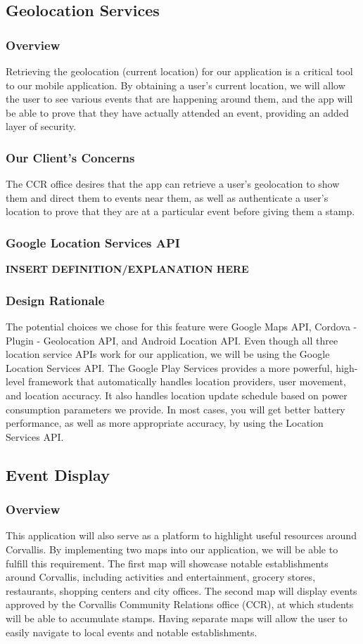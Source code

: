 \documentclass[draftclsnofoot, onecolumn, 10pt, compsoc]{IEEEtran}
\begin{document}
		\subsection{Geolocation Services}
			\subsubsection{Overview}
				Retrieving the geolocation (current location) for our application is a critical tool to our mobile application. By obtaining a user's current location, we will allow the user to see various events that are happening around them, and the app will be able to prove that they have actually attended an event, providing an added layer of security. 
			\subsubsection{Our Client's Concerns}
				The CCR office desires that the app can retrieve a user's geolocation to show them and direct them to events near them, as well as authenticate a user's location to prove that they are at a particular event before giving them a stamp.
			\subsubsection{Google Location Services API}
				\textbf{INSERT DEFINITION/EXPLANATION HERE}
				~\cite{GMaps}
			\subsubsection{Design Rationale}
				The potential choices we chose for this feature were Google Maps API, Cordova - Plugin - Geolocation API, and Android Location API. Even though all three location service APIs work for our application, we will be using the Google Location Services API. The Google Play Services provides a more powerful, high-level framework that automatically handles location providers, user movement, and location accuracy. It also handles location update schedule based on power consumption parameters we provide. In most cases, you will get better battery performance, as well as more appropriate accuracy, by using the Location Services API.
				~\cite{GMaps}
				
		\subsection{Event Display}
			\subsubsection{Overview}
				This application will also serve as a platform to highlight useful resources around Corvallis. By implementing two maps into our application, we will be able to fulfill this requirement. The first map will showcase notable establishments around Corvallis, including activities and entertainment, grocery stores, restaurants, shopping centers and city offices. The second map will display events approved by the Corvallis Community Relations office (CCR), at which students will be able to accumulate stamps. Having separate maps will allow the user to easily navigate to local events and notable establishments. 
\end{document}
